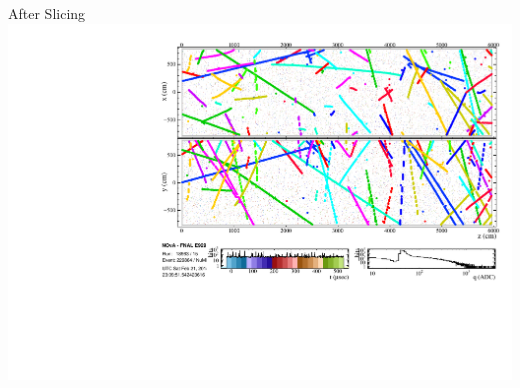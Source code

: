 \documentclass[10pt,professionalfonts,xcolor=table]{beamer}
\begin{document}
\begin{frame}
\begin{columns}[b]
\centering
\textcolor{custom_red}{After Slicing}
\includegraphics[height=\textwidth, angle=-90]{figures/evd_steps/evd_slice.pdf}

\end{columns}

\end{frame}
\end{document}
